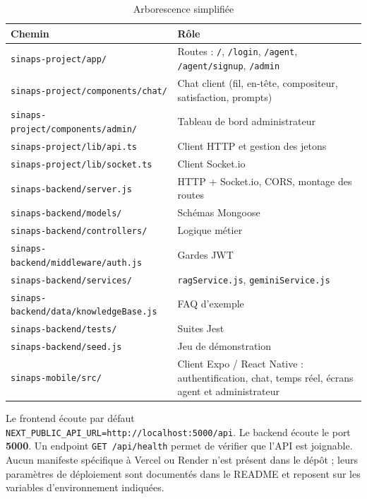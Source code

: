 \begin{table}[H]
\centering
\caption{Arborescence simplifiée}
\label{tab:tree}
\begin{tabularx}{\textwidth}{|l|X|}
\hline
Chemin & Rôle \\
\hline
\texttt{sinaps-project/app/} & Routes : \texttt{/}, \texttt{/login}, \texttt{/agent}, \texttt{/agent/signup}, \texttt{/admin} \\
\hline
\texttt{sinaps-project/components/chat/} & Chat client (fil, en-tête, compositeur, satisfaction, prompts) \\
\hline
\texttt{sinaps-project/components/admin/} & Tableau de bord administrateur \\
\hline
\texttt{sinaps-project/lib/api.ts} & Client HTTP et gestion des jetons \\
\hline
\texttt{sinaps-project/lib/socket.ts} & Client Socket.io \\
\hline
\texttt{sinaps-backend/server.js} & HTTP + Socket.io, CORS, montage des routes \\
\hline
\texttt{sinaps-backend/models/} & Schémas Mongoose \\
\hline
\texttt{sinaps-backend/controllers/} & Logique métier \\
\hline
\texttt{sinaps-backend/middleware/auth.js} & Gardes JWT \\
\hline
\texttt{sinaps-backend/services/} & \texttt{ragService.js}, \texttt{geminiService.js} \\
\hline
\texttt{sinaps-backend/data/knowledgeBase.js} & FAQ d'exemple \\
\hline
\texttt{sinaps-backend/tests/} & Suites Jest \\
\hline
\texttt{sinaps-backend/seed.js} & Jeu de démonstration \\
\hline
\texttt{sinaps-mobile/src/} & Client Expo / React Native : authentification, chat, temps réel, écrans agent et administrateur \\
\hline
\end{tabularx}
\end{table}

Le frontend écoute par défaut \texttt{NEXT\_PUBLIC\_API\_URL=http://localhost:5000/api}. Le backend écoute le port \textbf{5000}. Un endpoint \texttt{GET /api/health} permet de vérifier que l'API est joignable. Aucun manifeste spécifique à Vercel ou Render n'est présent dans le dépôt ; leurs paramètres de déploiement sont documentés dans le README et reposent sur les variables d'environnement indiquées.

